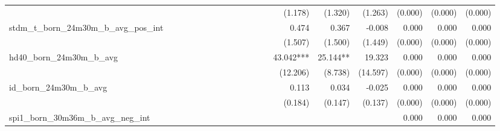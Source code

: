 \begin{tabular}{lrrrrrrrrrrrrrrrrrr}
                                            &              &              &              &              &              &              &              &              &               &              &              &               &      (1.178) &      (1.320) &       (1.263) &      (0.000) &      (0.000) &       (0.000) \\ 
stdm\_t\_born\_24m30m\_b\_avg\_pos\_int     &              &              &              &              &              &              &              &              &               &              &              &               &        0.474 &        0.367 &        -0.008 &        0.000 &        0.000 &         0.000 \\ 
                                            &              &              &              &              &              &              &              &              &               &              &              &               &      (1.507) &      (1.500) &       (1.449) &      (0.000) &      (0.000) &       (0.000) \\ 
hd40\_born\_24m30m\_b\_avg                  &              &              &              &              &              &              &              &              &               &              &              &               &    43.042*** &     25.144** &        19.323 &        0.000 &        0.000 &         0.000 \\ 
                                            &              &              &              &              &              &              &              &              &               &              &              &               &     (12.206) &      (8.738) &      (14.597) &      (0.000) &      (0.000) &       (0.000) \\ 
id\_born\_24m30m\_b\_avg                    &              &              &              &              &              &              &              &              &               &              &              &               &        0.113 &        0.034 &        -0.025 &        0.000 &        0.000 &         0.000 \\ 
                                            &              &              &              &              &              &              &              &              &               &              &              &               &      (0.184) &      (0.147) &       (0.137) &      (0.000) &      (0.000) &       (0.000) \\ 
spi1\_born\_30m36m\_b\_avg\_neg\_int        &              &              &              &              &              &              &              &              &               &              &              &               &              &              &               &        0.000 &        0.000 &         0.000 \\ 

\end{tabular}
